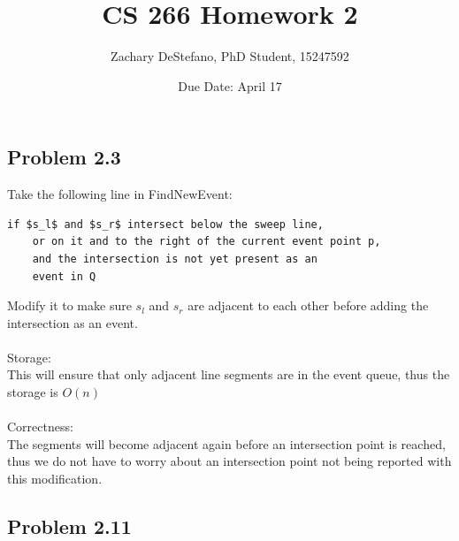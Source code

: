 \documentclass[11pt,psfig]{article}
\begin{document}
\setlength{\parskip}{1.2ex plus0.3ex minus 0.3ex}


\thispagestyle{empty} \pagestyle{myheadings} 



\title{CS 266 Homework 2}
\author{Zachary DeStefano, PhD Student, 15247592}
\date{Due Date: April 17}

\maketitle

\vfill\eject

\subsection*{Problem 2.3}

Take the following line in FindNewEvent:
\begin{verbatim}
if $s_l$ and $s_r$ intersect below the sweep line, 
	or on it and to the right of the current event point p, 
	and the intersection is not yet present as an
	event in Q
\end{verbatim}
Modify it to make sure $s_l$ and $s_r$ are adjacent to each other before adding the intersection as an event. \\
\\
Storage:\\
This will ensure that only adjacent line segments are in the event queue, thus the storage is $O(n)$\\
\\
Correctness:\\
The segments will become adjacent again before an intersection point is reached, thus we do not have to worry about an intersection point not being reported with this modification. 

\newpage

\subsection*{Problem 2.11}
\end{document}
